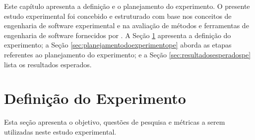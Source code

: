 \acresetall 


Este capítulo apresenta a definição e o planejamento do experimento. O presente estudo experimental foi concebido e estruturado com base nos conceitos de engenharia de software experimental e na avaliação de métodos e ferramentas de engenharia de software fornecidos por . A Seção \ref{sec:definicaodoexperimento} apresenta a definição do experimento; a Seção \ref{sec:planejamentodoexperimentope} aborda as etapas referentes ao planejamento do experimento; e a Seção \ref{sec:resultadosesperadospe} lista os resultados esperados.

\section{Definição do Experimento}\label{sec:definicaodoexperimento}

Esta seção apresenta o objetivo, questões de pesquisa e métricas a serem utilizadas neste estudo experimental. 

